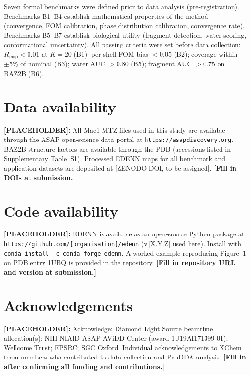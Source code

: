 \documentclass[10pt,twocolumn]{article}
\newcommand{\placeholder}[1]{%
  \begin{mdframed}[
    linecolor=placeholder,linewidth=1pt,
    backgroundcolor=red!5,
    innertopmargin=6pt,innerbottommargin=6pt,
    innerleftmargin=8pt,innerrightmargin=8pt]
  \small\color{placeholder}\textbf{[PLACEHOLDER]:} #1
  \end{mdframed}
}
\begin{document}
Seven formal benchmarks were defined prior to data analysis
(pre-registration).  Benchmarks B1--B4 establish mathematical
properties of the method (convergence, FOM calibration, phase
distribution calibration, convergence rate).
Benchmarks B5--B7 establish biological utility (fragment detection,
water scoring, conformational uncertainty).
All passing criteria were set before data collection:
$R_{\mathrm{map}} < 0.01$ at $K=20$ (B1);
per-shell FOM bias $< 0.05$ (B2); coverage within $\pm 5$\%
of nominal (B3); water AUC $> 0.80$ (B5);
fragment AUC $> 0.75$ on BAZ2B (B6).

\section*{Data availability}

\placeholder{
All Mac1 MTZ files used in this study are available through the
ASAP open-science data portal at
\texttt{https://asapdiscovery.org}.
BAZ2B structure factors are available through the PDB
(accessions listed in Supplementary Table~S1).
Processed EDENN maps for all benchmark and application datasets
are deposited at [ZENODO DOI, to be assigned].
\textbf{[Fill in DOIs at submission.]}
}

\section*{Code availability}

\placeholder{
EDENN is available as an open-source Python package at
\texttt{https://github.com/[organisation]/edenn} (v\,[X.Y.Z] used here).
Install with \texttt{conda install -c conda-forge edenn}.
A worked example reproducing Figure~1 on PDB entry 1UBQ is
provided in the repository.
\textbf{[Fill in repository URL and version at submission.]}
}

\section*{Acknowledgements}

\placeholder{
Acknowledge: Diamond Light Source beamtime allocation(s);
NIH NIAID ASAP AViDD Center (award 1U19AI171399-01);
Wellcome Trust; EPSRC; SGC Oxford.
Individual acknowledgements to XChem team members who contributed
to data collection and PanDDA analysis.
\textbf{[Fill in after confirming all funding and contributions.]}
}
\end{document}
